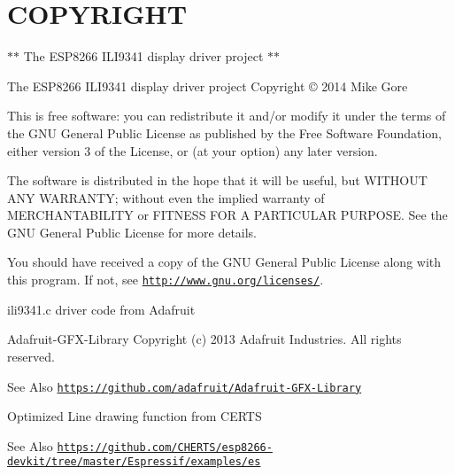 \hypertarget{index_COPYRIGHT}{}\section{C\-O\-P\-Y\-R\-I\-G\-H\-T}\label{index_COPYRIGHT}
$\ast$$\ast$ The E\-S\-P8266 I\-L\-I9341 display driver project $\ast$$\ast$

\begin{DoxyParagraph}{The E\-S\-P8266 I\-L\-I9341 display driver project Copyright \copyright{} 2014 Mike Gore}

\end{DoxyParagraph}
This is free software\-: you can redistribute it and/or modify it under the terms of the G\-N\-U General Public License as published by the Free Software Foundation, either version 3 of the License, or (at your option) any later version.

The software is distributed in the hope that it will be useful, but W\-I\-T\-H\-O\-U\-T A\-N\-Y W\-A\-R\-R\-A\-N\-T\-Y; without even the implied warranty of M\-E\-R\-C\-H\-A\-N\-T\-A\-B\-I\-L\-I\-T\-Y or F\-I\-T\-N\-E\-S\-S F\-O\-R A P\-A\-R\-T\-I\-C\-U\-L\-A\-R P\-U\-R\-P\-O\-S\-E. See the G\-N\-U General Public License for more details.

You should have received a copy of the G\-N\-U General Public License along with this program. If not, see \href{http://www.gnu.org/licenses/}{\tt http\-://www.\-gnu.\-org/licenses/}.



 \begin{DoxyParagraph}{ili9341.c driver code from Adafruit}

\end{DoxyParagraph}
\begin{DoxyParagraph}{Adafruit-\/\-G\-F\-X-\/\-Library Copyright (c) 2013 Adafruit Industries. }
All rights reserved. 
\end{DoxyParagraph}
\begin{DoxySeeAlso}{See Also}
\href{https://github.com/adafruit/Adafruit-GFX-Library}{\tt https\-://github.\-com/adafruit/\-Adafruit-\/\-G\-F\-X-\/\-Library}
\end{DoxySeeAlso}




\begin{DoxyParagraph}{Optimized Line drawing function from C\-E\-R\-T\-S}

\end{DoxyParagraph}
\begin{DoxySeeAlso}{See Also}
\href{https://github.com/CHERTS/esp8266-devkit/tree/master/Espressif/examples/es}{\tt https\-://github.\-com/\-C\-H\-E\-R\-T\-S/esp8266-\/devkit/tree/master/\-Espressif/examples/es}
\end{DoxySeeAlso}


